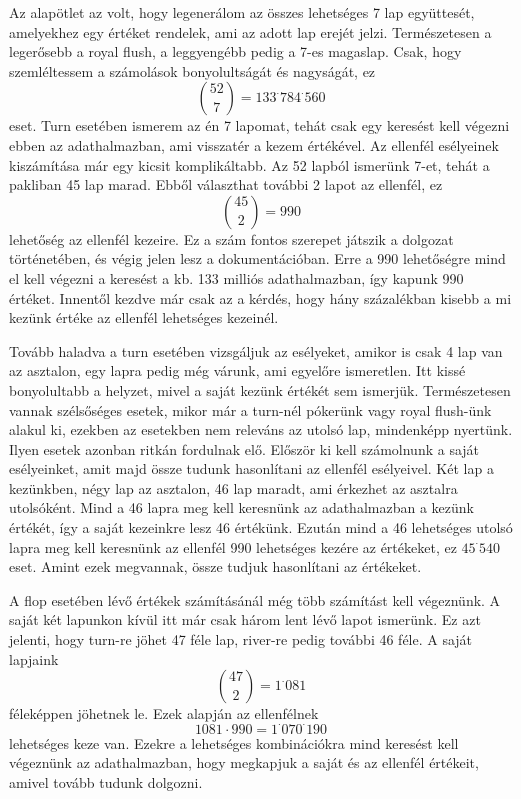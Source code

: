 Az alapötlet az volt, hogy legenerálom az összes lehetséges 7 lap együttesét, amelyekhez egy értéket rendelek, ami az adott lap erejét jelzi. Természetesen a legerősebb a royal flush, a leggyengébb pedig a 7-es magaslap. Csak, hogy szemléltessem a számolások bonyolultságát és nagyságát, ez \[ \binom{52}{7}=133^{\cdot}784^{\cdot}560\] eset. Turn esetében ismerem az én 7 lapomat, tehát csak egy keresést kell végezni ebben az adathalmazban, ami visszatér a kezem értékével. Az ellenfél esélyeinek kiszámítása már egy kicsit komplikáltabb. Az 52 lapból ismerünk 7-et, tehát a pakliban 45 lap marad. Ebből választhat további 2 lapot az ellenfél, ez \[ \binom{45}{2}=990\] lehetőség az ellenfél kezeire. Ez a szám fontos szerepet játszik a dolgozat történetében, és végig jelen lesz a dokumentációban. Erre a 990 lehetőségre mind el kell végezni a keresést a kb. 133 milliós adathalmazban, így kapunk 990 értéket. Innentől kezdve már csak az a kérdés, hogy hány százalékban kisebb a mi kezünk értéke az ellenfél lehetséges kezeinél. 

Tovább haladva a turn esetében vizsgáljuk az esélyeket, amikor is csak 4 lap van az asztalon, egy lapra pedig még várunk, ami egyelőre ismeretlen. Itt kissé bonyolultabb a helyzet, mivel a saját kezünk értékét sem ismerjük. Természetesen vannak szélsőséges esetek, mikor már a turn-nél pókerünk vagy royal flush-ünk alakul ki, ezekben az esetekben nem releváns az utolsó lap, mindenképp nyertünk. Ilyen esetek azonban ritkán fordulnak elő. Először ki kell számolnunk a saját esélyeinket, amit majd össze tudunk hasonlítani az ellenfél esélyeivel. Két lap a kezünkben, négy lap az asztalon, 46 lap maradt, ami érkezhet az asztalra utolsóként. Mind a 46 lapra meg kell keresnünk az adathalmazban a kezünk értékét, így a saját kezeinkre lesz 46 értékünk. Ezután mind a 46 lehetséges utolsó lapra meg kell keresnünk az ellenfél 990 lehetséges kezére az értékeket, ez $45^{\cdot}540$ eset. Amint ezek megvannak, össze tudjuk hasonlítani az értékeket.

A flop esetében lévő értékek számításánál még több számítást kell végeznünk. A saját két lapunkon kívül itt már csak három lent lévő lapot ismerünk. Ez azt jelenti, hogy turn-re jöhet 47 féle lap, river-re pedig további 46 féle. A saját lapjaink \[ \binom{47}{2}=1^{\cdot}081\] féleképpen jöhetnek le. Ezek alapján az ellenfélnek \[1081\cdot990=1^{\cdot}070^{\cdot}190\] lehetséges keze van. Ezekre a lehetséges kombinációkra mind keresést kell végeznünk az adathalmazban, hogy megkapjuk a saját és az ellenfél értékeit, amivel tovább tudunk dolgozni.

